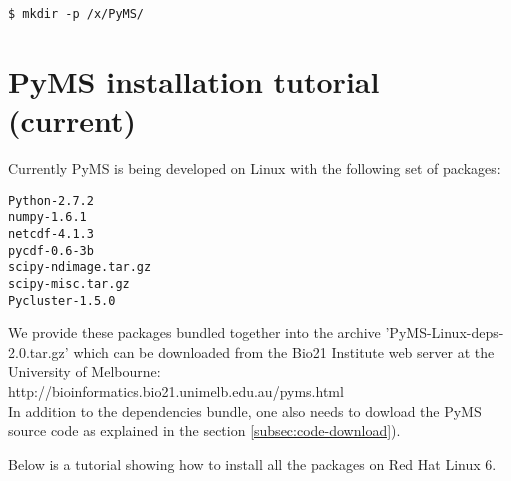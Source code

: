 \begin{verbatim}
$ mkdir -p /x/PyMS/
\end{verbatim}

\section{PyMS installation tutorial (current)}

Currently PyMS is being developed on Linux with the following set of
packages:

\begin{verbatim}
Python-2.7.2
numpy-1.6.1
netcdf-4.1.3
pycdf-0.6-3b
scipy-ndimage.tar.gz
scipy-misc.tar.gz
Pycluster-1.5.0
\end{verbatim}

We provide these packages bundled together into the archive
'PyMS-Linux-deps-2.0.tar.gz' which can be downloaded from
the Bio21 Institute web server at the University of Melbourne:\\
http://bioinformatics.bio21.unimelb.edu.au/pyms.html\\

In addition to the dependencies bundle, one also needs to dowload the
PyMS source code as explained in the section \ref{subsec:code-download}).

Below is a tutorial showing how to install all the packages on Red Hat
Linux 6.

